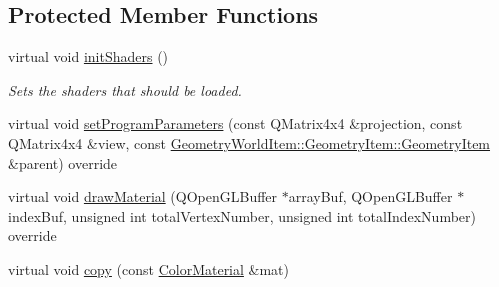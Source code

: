 \subsection*{Protected Member Functions}
\begin{DoxyCompactItemize}
\item 
\mbox{\label{class_geometry_engine_1_1_geometry_material_1_1_color_material_ac0997ea93130c3fc270327948083059d}} 
virtual void \mbox{\hyperlink{class_geometry_engine_1_1_geometry_material_1_1_color_material_ac0997ea93130c3fc270327948083059d}{init\+Shaders}} ()
\begin{DoxyCompactList}\small\item\em Sets the shaders that should be loaded. \end{DoxyCompactList}\item 
virtual void \mbox{\hyperlink{class_geometry_engine_1_1_geometry_material_1_1_color_material_afc9bcbd2091f6592dfb8a6ace1d4adfb}{set\+Program\+Parameters}} (const Q\+Matrix4x4 \&projection, const Q\+Matrix4x4 \&view, const \mbox{\hyperlink{class_geometry_engine_1_1_geometry_world_item_1_1_geometry_item_1_1_geometry_item}{Geometry\+World\+Item\+::\+Geometry\+Item\+::\+Geometry\+Item}} \&parent) override
\item 
virtual void \mbox{\hyperlink{class_geometry_engine_1_1_geometry_material_1_1_color_material_abaf6f7ed79dad79253ea469c4c7460eb}{draw\+Material}} (Q\+Open\+G\+L\+Buffer $\ast$array\+Buf, Q\+Open\+G\+L\+Buffer $\ast$index\+Buf, unsigned int total\+Vertex\+Number, unsigned int total\+Index\+Number) override
\item 
virtual void \mbox{\hyperlink{class_geometry_engine_1_1_geometry_material_1_1_color_material_a11ddb849641dc6216d7ded2331636d46}{copy}} (const \mbox{\hyperlink{class_geometry_engine_1_1_geometry_material_1_1_color_material}{Color\+Material}} \&mat)
\end{DoxyCompactItemize}
